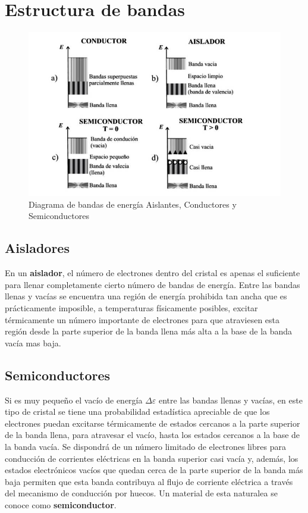 \documentclass[oneside]{book}
\numberwithin{equation}{section}
\numberwithin{figure}{section}
\numberwithin{table}{section}
\begin{document}
		\section{Estructura de bandas}
		
			\begin{figure}[H]
				\begin{center}
					\includegraphics[scale=0.75]{Bandas.jpg} 
					\caption{Diagrama de bandas de energía Aislantes, Conductores y Semiconductores}
				\end{center}
			\end{figure}
			
			\subsection{Aisladores}
			
				En un \textbf{aislador}, el número de electrones dentro del cristal es apenas el suficiente para llenar completamente cierto número de bandas de energía. Entre las bandas llenas y vacías se encuentra una región de energía prohibida tan ancha que es prácticamente imposible, a temperaturas físicamente posibles, excitar térmicamente un número importante de electrones para que atraviesen esta región desde la parte superior de la banda llena más alta a la base de la banda vacía mas baja.
			
			\subsection{Semiconductores}	
			
				Si es muy pequeño el vacío de energía $\Delta \varepsilon$ entre las bandas llenas y vacías, en este tipo de cristal se tiene una probabilidad estadística apreciable de que los electrones puedan excitarse térmicamente de estados cercanos a la parte superior de la banda llena, para atravesar el vacío, hasta los estados cercanos a la base de la banda vacía. Se dispondrá de un número limitado de electrones libres para conducción de corrientes eléctricas en la banda superior casi vacía y, además, los estados electrónicos vacíos que quedan cerca de la parte superior de la banda más baja permiten que esta banda contribuya al flujo de corriente eléctrica a través del mecanismo de conducción por huecos. Un material de esta naturalea se conoce como \textbf{semiconductor}.			
			
\end{document}
